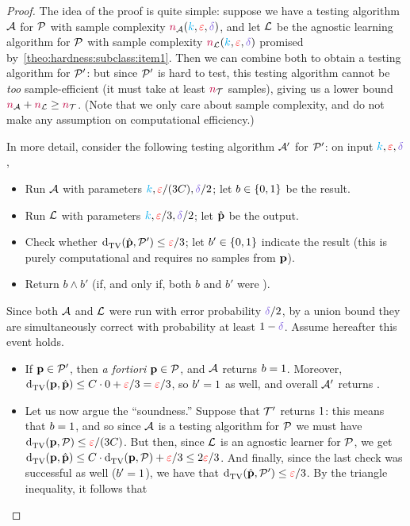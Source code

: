 \begin{proof}
The idea of the proof is quite simple: suppose we have a testing algorithm $\mathcal{A}$ for $\mathcal{P}$ with sample complexity $\ns_\Algo(\ab,\dst,\errprob)$, and let $\mathcal{L}$ be the agnostic learning algorithm for $\mathcal{P}$ with sample complexity $\ns_{\mathcal{L}}(\ab,\dst,\errprob)$ promised by~\cref{theo:hardness:subclass:item1}. Then we can combine both to obtain a testing algorithm for $\mathcal{P}'$: but since $\mathcal{P}'$ is hard to test, this testing algorithm cannot be \emph{too} sample-efficient (it must take at least ${\textcolor{purple}{n}}_{\mathcal{T}}$ samples), giving us a lower bound ${\textcolor{purple}{n}}_\mathcal{A}+{\textcolor{purple}{n}}_\mathcal{L} \geq {\textcolor{purple}{n}}_{\mathcal{T}}$. (Note that we only care about sample complexity, and do not make any assumption on computational efficiency.)

\noindent In more detail, consider the following testing algorithm $\mathcal{A}'$ for $\mathcal{P}'$: on input $\ab,\dst,\errprob$,
\begin{itemize}
	\item Run $\mathcal{A}$ with parameters $\ab,\dst/(3C),\errprob/2$; let $b\in\{0,1\}$ be the result.
	\item Run $\mathcal{L}$ with parameters $\ab,\dst/3,\errprob/2$; let $\hat{\mathbf{p}}$ be the output.
	\item Check whether $\totalvardist{\hat{\p}}{\property'} \leq \dst/3$; let $b'\in\{0,1\}$ indicate the result (this is purely computational and requires no samples from $\mathbf{p}$).
	\item Return $b\land b'$ (\ie \accept if, and only if, both $b$ and $b'$ were \accept).
\end{itemize}
Since both $\mathcal{A}$ and $\mathcal{L}$ were run with error probability $\errprob/2$, by a union bound they are simultaneously correct with probability at least $1-\errprob$. Assume hereafter this event holds.
\begin{itemize}
\item If $\mathbf{p}\in\mathcal{P}'$, then \textit{a fortiori} $\mathbf{p}\in\mathcal{P}$, and $\mathcal{A}$ returns $b=1$. Moreover, $\totalvardist{\p}{\hat{\p}} \leq C\cdot 0 + \dst/3 = \dst/3$, so $b'=1$ as well, and overall $\mathcal{A}'$ returns \accept.
\item Let us now argue the ``soundness.'' Suppose that $\mathcal{T}'$ returns $1$: this means that $b=1$, and so since $\mathcal{A}$ is a testing algorithm for $\mathcal{P}$ we must have $\totalvardist{\p}{\property} \leq \dst/(3C)$. But then, since $\mathcal{L}$ is an agnostic learner for $\mathcal{P}$, we get $\totalvardist{\p}{\hat{\p}} \leq C\cdot \totalvardist{\p}{\property} + \dst/3 \leq 2\dst/3$. And finally, since the last check was successful as well ($b'=1$), we have that $\totalvardist{\hat{\p}}{\property'} \leq \dst/3$. By the triangle inequality, it follows that

\end{itemize}
\end{proof}
